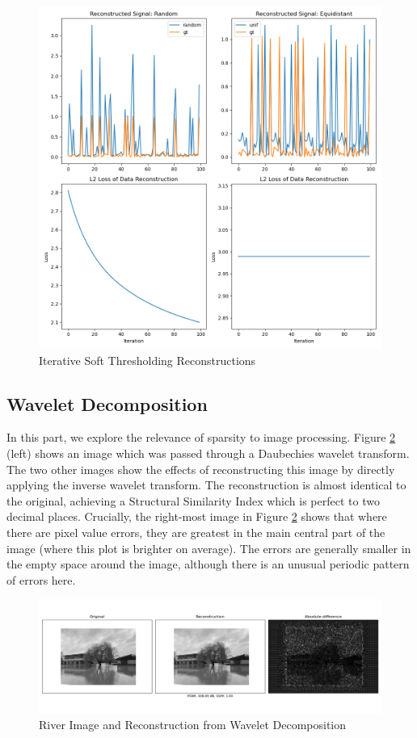 \documentclass[12pt]{article}
\begin{document}
\begin{figure}[hp]
    \includegraphics[scale=0.5]{figures/signal_reconstruct.png}
    \caption{Iterative Soft Thresholding Reconstructions}
    \label{fig:signal_reconstruct}
\end{figure}

\subsection{Wavelet Decomposition}

In this part, we explore the relevance of sparsity to image processing.
Figure \ref{fig:river_img} (left) shows an image which was passed through a Daubechies wavelet transform.
The two other images show the effects of reconstructing this image by directly applying the inverse wavelet transform.
The reconstruction is almost identical to the original, achieving a Structural Similarity Index which is perfect to two decimal places.
Crucially, the right-most image in Figure \ref{fig:river_img} shows that where there are pixel value errors,
they are greatest in the main central part of the image (where this plot is brighter on average).
The errors are generally smaller in the empty space around the image, although there is an unusual periodic pattern of errors here.

\begin{figure}[hp]
    \includegraphics[scale=0.35]{figures/river_img.png}
    \caption{River Image and Reconstruction from Wavelet Decomposition}
    \label{fig:river_img}
\end{figure}
\end{document}
